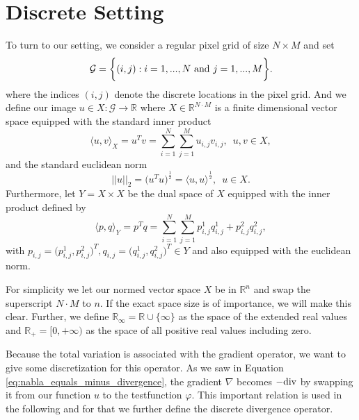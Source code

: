 \section{Discrete Setting} %
\label{sec:discrete_setting}

    To turn to our setting, we consider a regular pixel grid of size $N \times M$ and set
        \begin{equation}
            \mathcal{G} = \bigg\{ (i, j) : i = 1, ..., N \,\, \textnormal{and} \,\, j = 1, ..., M \bigg\}.
            \label{eq:pixel_grid}
        \end{equation}
    where the indices $(i, j)$ denote the discrete locations in the pixel grid. And we define our image $u \in X: \mathcal{G} \longrightarrow \mathbb{R}$ where $X \in \mathbb{R}^{N \cdot M}$ is a finite dimensional vector space equipped with the standard inner product
        \begin{equation}
            \langle u, v \rangle_{X} = u^{T}v = \sum_{i = 1}^{N} \sum_{j = 1}^{M} u_{i, j} v_{i, j}, \,\,\, u, v \in X,
            \label{eq:inner_product}
        \end{equation}
    and the standard euclidean norm
        $$
            ||u||_{2} = \big( u^{T} u \big)^{\frac{1}{2}} = \langle u, u \rangle^{\frac{1}{2}}, \,\,\, u \in X.
        $$
    Furthermore, let $Y = X \times X$ be the dual space of $X$ equipped with the inner product defined by
        $$
            \langle p, q \rangle_{Y} = p^{T}q = \sum_{i = 1}^{N} \sum_{j = 1}^{M} p^{1}_{i, j} q^{1}_{i, j} + p^{2}_{i, j} q^{2}_{i, j},
        $$
    with $p_{i, j} = \big(p^{1}_{i, j}, p^{2}_{i, j}\big)^{T}, q_{i, j} = \big(q^{1}_{i, j}, q^{2}_{i, j}\big)^{T} \in Y$ and also equipped with the euclidean norm.

    For simplicity we let our normed vector space $X$ be in $\mathbb{R}^{n}$ and swap the superscript $N \cdot M$ to $n$. If the exact space size is of importance, we will make this clear. Further, we define $\mathbb{R}_{\infty} = \mathbb{R} \cup \{\infty\}$ as the space of the extended real values and $\mathbb{R}_{+} = [0, +\infty)$ as the space of all positive real values including zero.

    Because the total variation is associated with the gradient operator, we want to give some discretization for this operator. As we saw in Equation \ref{eq:nabla_equals_minus_divergence}, the gradient $\nabla$ becomes $- \textnormal{div}$ by swapping it from our function $u$ to the testfunction $\varphi$. This important relation is used in the following and for that we further define the discrete divergence operator.

